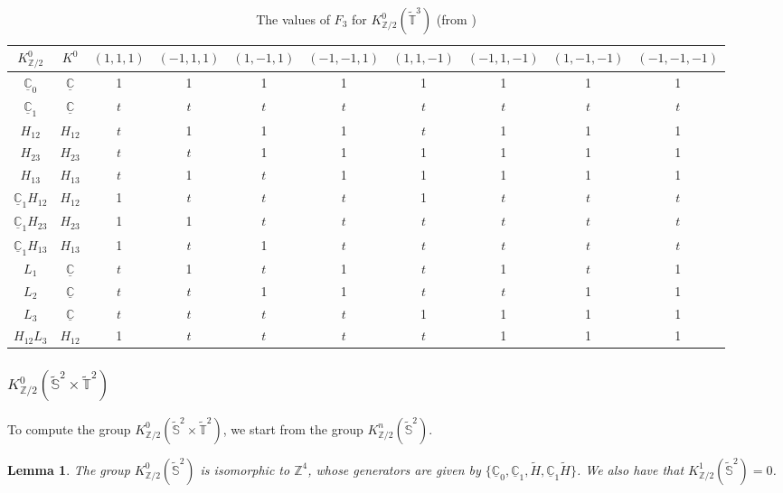 \documentclass{amsart}
\theoremstyle{plain}
\newtheorem{lemma}[theorem]{Lemma}
\theoremstyle{definition}
\theoremstyle{remark}
\newcommand{\Z}{\mathbb{Z}}
\newcommand{\C}{\mathbb{C}}
\newcommand{\T}{\mathbb{T}}
\newcommand{\SSS}{\mathbb{S}}
\newcommand{\tT}{\widetilde{\T}}
\newcommand{\tS}{\widetilde{\SSS}}
\newcommand{\tH}{\widetilde{H}}
\newcommand{\uC}{\underline{\C}}
\begin{document}
\begin{table}
\caption{The values of $F_3$ for $K^0_{\Z/2}(\tT^3)$ (from \cite[Fig.1]{Gomi15})}
\label{table3}
\begin{tabular}{c@{}|c|@{}c@{}c@{}c@{}c|@{}c@{}c@{}c@{}c}
$K^0_{\Z/2}$ &
$K^0$ &
$\scriptstyle{(1, 1, 1)}$ & $\scriptstyle{(-1, 1, 1)}$ &
$\scriptstyle{(1, -1, 1)}$ & $\scriptstyle{(-1, -1, 1)}$ &
$\scriptstyle{(1, 1, -1)}$ & $\scriptstyle{(-1, 1, -1)}$ &
$\scriptstyle{(1,-1,-1)}$ & $\scriptstyle{(-1, -1, -1)}$ \\
\hline
$\uC_0$ & $\uC$ &
1 & 1 & 1 & 1 &
1 & 1 & 1 & 1 \\
$\uC_1$ & $\uC$ &
$t$ & $t$ &$ t$ & $t$ &
$t$ & $t$ & $t$ & $t$ \\
\hline
$H_{12}$ & $H_{12}$ &
$t$ & 1 & 1 & 1 &
$t$ & 1 & 1 & 1 \\
$H_{23}$ & $H_{23}$ &
$t$ & $t$ & 1 & 1 &
1 & 1 & 1 & 1 \\
$H_{13}$ & $H_{13}$ &
$t$ & 1 & $t$ & 1 &
1 & 1 & 1 & 1 \\
\hline
$\uC_1H_{12}$ & $H_{12}$ &
1 & $t$ & $t$ & $t$ &
1 & $t$ & $t$ & $t$ \\
$\uC_1H_{23}$ & $H_{23}$ &
1 & 1 & $t$ & $t$ &
$t$ & $t$ & $t$ & $t$ \\
$\uC_1H_{13}$ & $H_{13}$ &
1 & $t$ & 1 & $t$ &
$t$ & $t$ & $t$ & $t$ \\
\hline
$L_1$ & $\uC$ &
$t$ & 1 & $t$ & 1 &
$t$ & 1 & $t$ & 1 \\
$L_2$ & $\uC$ &
$t$ & $t$ & 1 & 1 &
$t$ & $t$ & 1 & 1 \\
$L_3$ & $\uC$ &
$t$ & $t$ & $t$ & $t$ &
1 & 1 & 1 & 1 \\
\hline
$H_{12}L_3$ & $H_{12}$ &
1 & $t$ & $t$ & $t$ &
$t$ & 1 & 1 & 1\\
\end{tabular}
\end{table}

\subsubsection{$K^0_{\Z/2}(\tS^2 \times \tT^2)$}
\label{Sect3.3.5}
To compute the group $K^0_{\Z/2}(\tS^2 \times \tT^2)$, we start from the group $K^n_{\Z/2}(\tS^2)$.

\begin{lemma}
\label{lem3.7}
The group $K^0_{\Z/2}(\tS^2)$ is isomorphic to $\Z^4$, whose generators are given by $\{ \uC_0, \uC_1, \tH, \uC_1 \tH \}$.
We also have that $K^1_{\Z/2}(\tS^2) = 0$.
\end{lemma}
\end{document}
